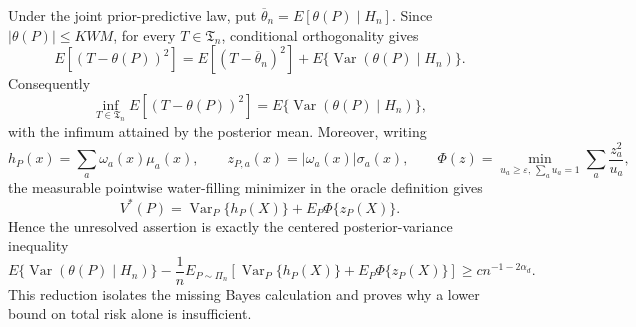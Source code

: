 Under the joint prior-predictive law, put
\(\overline\theta_n=E[\theta(P)\mid H_n]\).  Since
\(|\theta(P)|\leq KWM\), for every \(T\in\mathfrak T_n\), conditional orthogonality gives
\[
E[(T-\theta(P))^2]
=E[(T-\overline\theta_n)^2]
+E\{\operatorname{Var}(\theta(P)\mid H_n)\}.
\]
Consequently
\[
\inf_{T\in\mathfrak T_n}E[(T-\theta(P))^2]
=E\{\operatorname{Var}(\theta(P)\mid H_n)\},
\]
with the infimum attained by the posterior mean.  Moreover, writing
\[
h_P(x)=\sum_a\omega_a(x)\mu_a(x),
\qquad
z_{P,a}(x)=|\omega_a(x)|\sigma_a(x),
\qquad
\Phi(z)=\min_{u_a\geq\varepsilon,\,\sum_a u_a=1}
\sum_a\frac{z_a^2}{u_a},
\]
the measurable pointwise water-filling minimizer in the oracle definition gives
\[
V^*(P)=\operatorname{Var}_P\{h_P(X)\}+E_P\Phi\{z_P(X)\}.
\]
Hence the unresolved assertion is exactly the centered posterior-variance inequality
\[
E\{\operatorname{Var}(\theta(P)\mid H_n)\}
-\frac1nE_{P\sim\Pi_n}
\left[\operatorname{Var}_P\{h_P(X)\}+E_P\Phi\{z_P(X)\}\right]
\geq c n^{-1-2\alpha_d}.
\]
This reduction isolates the missing Bayes calculation and proves why a lower bound on total risk alone is insufficient.